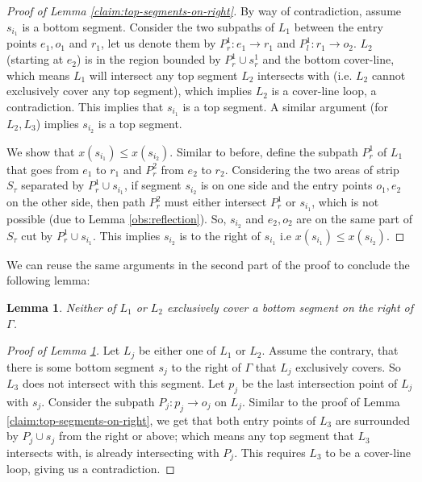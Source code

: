 \documentclass[pdflatex,sn-mathphys-num]{sn-jnl}
\theoremstyle{thmstyleone}
\newtheorem{lemma}{Lemma}
\begin{document}
\begin{proof}[Proof of Lemma \ref{claim:top-segments-on-right}]
	By way of contradiction, assume $s_{i_1}$ is a bottom segment. 
	Consider the two subpaths of $L_1$ between the entry points $e_1,o_1$ and $r_1$, let us denote them by $P^1_r: e_1 \to r_1$ and $P^1_l:r_1 \to o_2$. 
	$L_2$ (starting at $e_2$) is in the region bounded by $P^1_r\cup s^1_r$ and the bottom cover-line, which means $L_1$ will intersect any top segment
	$L_2$ intersects with (i.e. $L_2$ cannot exclusively cover any top segment), which implies $L_2$ is a cover-line loop, a contradiction.
	This implies that $s_{i_1}$ is a top segment.
	A similar argument (for $L_2,L_3$) implies $s_{i_2}$ is a top segment.
	
	We show that $x(s_{i_1}) \le x(s_{i_2})$. Similar to before, define the subpath $P^1_r$ of $L_1$ that goes from $e_1$ to $r_1$ and $P^2_r$ from $e_2$ to $r_2$. Considering the two areas of strip $S_\tau$ separated by $P^1_r \cup s_{i_1}$, if segment $s_{i_2}$ is on one side and the entry points $o_1, e_2$ on the other side, then path  $P^2_r$ must either intersect $P^1_r$ or $s_{i_1}$, which is not possible (due to Lemma \ref{obs:reflection}). So, $s_{i_2}$ and $e_2,o_2$ are on the same part of $S_\tau$ cut by $P^1_r\cup s_{i_1}$. This implies $s_{i_2}$ is to the right of $s_{i_1}$ i.e $x(s_{i_1}) \le x(s_{i_2})$. 
\end{proof}
    
    We can reuse the same arguments in the second part of the proof to conclude the following lemma:
    \begin{lemma}\label{claim:no-bottom-cover}
        Neither of $L_1$ or $L_2$ exclusively cover a bottom segment on the right of $\Gamma$.
    \end{lemma}
    
    \begin{proof}[Proof of Lemma \ref{claim:no-bottom-cover}]
        Let $L_j$ be either one of $L_1$ or $L_2$. Assume the contrary, that there is some bottom segment $s_j$ to the right of $\Gamma$ that $L_j$ exclusively covers. So $L_3$ does not intersect with this segment. Let $p_j$ be the last intersection point of $L_j$ with $s_j$. Consider the subpath $P_j: p_j \to o_j$ on $L_j$. Similar to the proof of Lemma \ref{claim:top-segments-on-right}, we get that both entry points of $L_3$ are surrounded by $P_j \cup s_j$ from the right or above; which means any top segment that $L_3$ intersects with, is already intersecting with $P_j$. This requires $L_3$ to be a cover-line loop, giving us a contradiction. 
    \end{proof}
    
\end{document}
